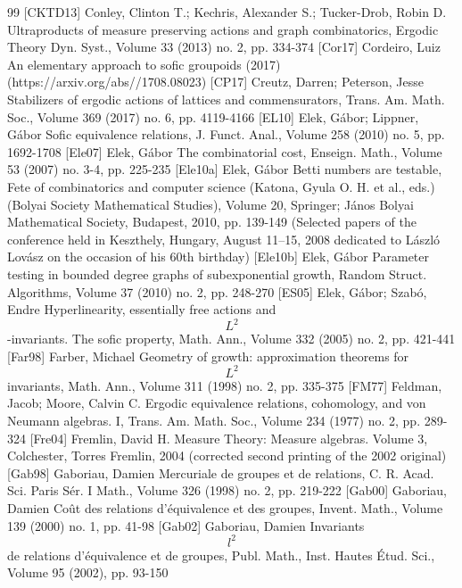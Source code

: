 \begin{thebibliography}{99}
 [CKTD13] Conley, Clinton T.; Kechris, Alexander S.; Tucker-Drob, Robin D. Ultraproducts of measure preserving actions and graph combinatorics, Ergodic Theory Dyn. Syst., Volume 33 (2013) no. 2, pp. 334-374
 [Cor17] Cordeiro, Luiz An elementary approach to sofic groupoids (2017) (https://arxiv.org/abs//1708.08023)
 [CP17] Creutz, Darren; Peterson, Jesse Stabilizers of ergodic actions of lattices and commensurators, Trans. Am. Math. Soc., Volume 369 (2017) no. 6, pp. 4119-4166
 [EL10] Elek, Gábor; Lippner, Gábor Sofic equivalence relations, J. Funct. Anal., Volume 258 (2010) no. 5, pp. 1692-1708
 [Ele07] Elek, Gábor The combinatorial cost, Enseign. Math., Volume 53 (2007) no. 3-4, pp. 225-235
 [Ele10a] Elek, Gábor Betti numbers are testable, Fete of combinatorics and computer science (Katona, Gyula O. H. et al., eds.) (Bolyai Society Mathematical Studies), Volume 20, Springer; János Bolyai Mathematical Society, Budapest, 2010, pp. 139-149 (Selected papers of the conference held in Keszthely, Hungary, August 11–15, 2008 dedicated to László Lovász on the occasion of his 60th birthday)
 [Ele10b] Elek, Gábor Parameter testing in bounded degree graphs of subexponential growth, Random Struct. Algorithms, Volume 37 (2010) no. 2, pp. 248-270
 [ES05] Elek, Gábor; Szabó, Endre Hyperlinearity, essentially free actions and $${L}^2$$-invariants. The sofic property, Math. Ann., Volume 332 (2005) no. 2, pp. 421-441
 [Far98] Farber, Michael Geometry of growth: approximation theorems for $${L}^2$$ invariants, Math. Ann., Volume 311 (1998) no. 2, pp. 335-375
 [FM77] Feldman, Jacob; Moore, Calvin C. Ergodic equivalence relations, cohomology, and von Neumann algebras. I, Trans. Am. Math. Soc., Volume 234 (1977) no. 2, pp. 289-324
 [Fre04] Fremlin, David H. Measure Theory: Measure algebras. Volume 3, Colchester, Torres Fremlin, 2004 (corrected second printing of the 2002 original)
 [Gab98] Gaboriau, Damien Mercuriale de groupes et de relations, C. R. Acad. Sci. Paris Sér. I Math., Volume 326 (1998) no. 2, pp. 219-222
 [Gab00] Gaboriau, Damien Coût des relations d’équivalence et des groupes, Invent. Math., Volume 139 (2000) no. 1, pp. 41-98
 [Gab02] Gaboriau, Damien Invariants $$l^2$$ de relations d’équivalence et de groupes, Publ. Math., Inst. Hautes Étud. Sci., Volume 95 (2002), pp. 93-150

\end{thebibliography}

